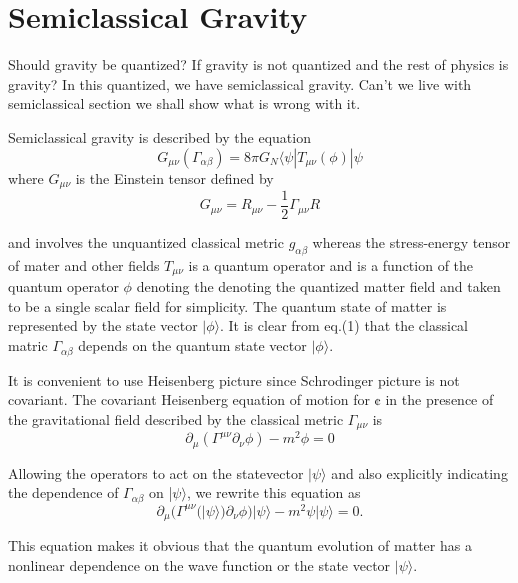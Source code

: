 \section{Semiclassical Gravity}

Should gravity be quantized? If gravity is not quantized and the rest of physics is
gravity? In this
quantized, we have semiclassical gravity. Can’t we live with semiclassical
section we shall show what is wrong with it.

Semiclassical gravity is described by the equation
\begin{equation*}
G_{\mu \nu}(\Gamma_{\alpha \beta}) = 8 \pi G_{N}\langle \psi | T_{\mu \nu} (\phi)| \psi \tag{1} 
\end{equation*}
where $G_{\mu \nu}$ is the Einstein tensor defined by
$$
G_{\mu \nu} = R_{\mu \nu} - \frac{1}{2} \Gamma_{\mu \nu} R
$$

and involves the unquantized classical metric $g_{\alpha \beta}$ whereas the stress-energy tensor
 of mater and other fields $T_{\mu \nu}$ is a quantum operator and is a function of the quantum operator $\phi$
 denoting the denoting the quantized matter field and taken to be a single scalar field for simplicity.
The quantum state of matter is represented by the state vector $|\phi \rangle$. It is clear from eq.(1)
that the classical matric $\Gamma_{\alpha \beta}$ depends on the quantum state vector
$|\phi \rangle$.


It is convenient to use Heisenberg picture since Schrodinger picture is not covariant.
The covariant Heisenberg equation of motion for ¢ in the presence of the gravitational field
described by the classical metric $\Gamma_{\mu \nu}$ is
\begin{equation*}
\partial_{\mu} (\Gamma^{\mu \nu} \partial_{\nu} \phi)- m^{2} \phi = 0\tag{2a} 
\end{equation*}

Allowing the operators to act on the statevector $|\psi \rangle$ and also explicitly indicating the
dependence of $\Gamma_{\alpha \beta}$ on |$\psi\rangle$, we rewrite this equation as
\begin{equation*}
\partial_{\mu}(\Gamma^{\mu \nu} (|\psi \rangle)\partial_{\nu} \phi) |\psi \rangle - m^{2} \psi | \psi \rangle =0. \tag{2b}
\end{equation*}

This equation makes it obvious that the quantum evolution of matter has a nonlinear
dependence on the wave function or the state vector $|\psi \rangle$.

